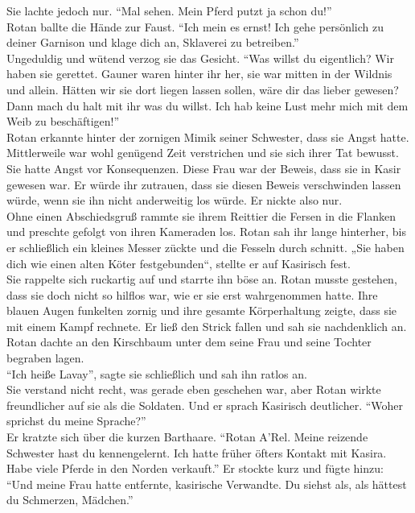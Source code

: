 Sie lachte jedoch nur. ``Mal sehen. Mein Pferd putzt ja schon du!''\\
Rotan ballte die Hände zur Faust. ``Ich mein es ernst! Ich gehe persönlich zu deiner Garnison und 
klage dich an, Sklaverei zu betreiben.''\\
Ungeduldig und wütend verzog sie das Gesicht. ``Was willst du eigentlich? Wir haben sie gerettet. 
Gauner waren hinter ihr her, sie war mitten in der Wildnis und allein. Hätten wir sie dort liegen 
lassen sollen, wäre dir das lieber gewesen? Dann mach du halt mit ihr was du willst. Ich hab keine 
Lust mehr mich mit dem Weib zu beschäftigen!''\\
Rotan erkannte hinter der zornigen Mimik seiner Schwester, dass sie Angst hatte. Mittlerweile war 
wohl genügend Zeit verstrichen und sie sich ihrer Tat bewusst. Sie hatte Angst vor Konsequenzen. 
Diese Frau war der Beweis, dass sie in Kasir gewesen war. Er würde ihr zutrauen, dass sie diesen 
Beweis verschwinden lassen würde, wenn sie ihn nicht anderweitig los würde. Er nickte also nur.\\
Ohne einen Abschiedsgruß rammte sie ihrem Reittier die Fersen in die Flanken und preschte gefolgt 
von ihren Kameraden los. Rotan sah ihr lange hinterher, bis er schließlich ein kleines Messer 
zückte und die Fesseln durch schnitt. „Sie haben dich wie einen alten Köter festgebunden“, stellte 
er auf Kasirisch fest.\\
Sie rappelte sich ruckartig auf und starrte ihn böse an. Rotan musste gestehen, dass sie doch nicht 
so hilflos war, wie er sie erst wahrgenommen hatte. Ihre blauen Augen funkelten zornig und ihre 
gesamte Körperhaltung zeigte, dass sie mit einem Kampf rechnete. Er ließ den Strick fallen und sah 
sie nachdenklich an. Rotan dachte an den Kirschbaum unter dem seine Frau und seine Tochter begraben 
lagen.\\
``Ich heiße Lavay'', sagte sie schließlich und sah ihn ratlos an. \\
Sie verstand nicht recht, was gerade eben geschehen war, aber Rotan wirkte freundlicher auf sie als 
die Soldaten. Und er sprach Kasirisch deutlicher. ``Woher sprichst du meine Sprache?''\\
Er kratzte sich über die kurzen Barthaare. ``Rotan A'Rel. Meine reizende Schwester hast du 
kennengelernt. Ich hatte früher öfters Kontakt mit Kasira. Habe viele Pferde in den Norden 
verkauft.'' Er stockte kurz und fügte hinzu: ``Und meine Frau hatte entfernte, kasirische 
Verwandte. Du siehst als, als hättest du Schmerzen, Mädchen.''\\
